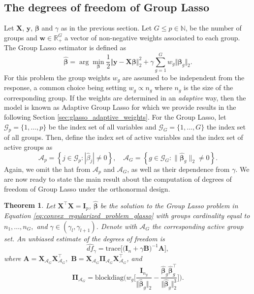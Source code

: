 \documentclass[a4paper, 12pt]{article}
\newcommand{\Aset}{\mathcal{A}}
\newcommand{\betahat}{\widehat{\boldsymbol\beta}}
\newcommand{\trace}{\mathrm{trace}}
\newcommand{\T}{\top}
\def\bbeta{\boldsymbol{\beta}}
\def\bPi{\boldsymbol{\Pi}}
\def\bw{\boldsymbol{w}}
\def\by{\boldsymbol{y}}
\def\bA{\mathbf{A}}
\def\bB{\mathbf{B}}
\def\bI{\mathbf{I}}
\def\bX{\mathbf{X}}
\def\bw{\mathbf{w}}
\def\by{\mathbf{y}}
\newtheorem{theorem}{Theorem}
\begin{document}
\subsection{The degrees of freedom of Group Lasso}
\label{sec:glasso_given_weights}
Let $\bX$, $\by$, $\bbeta$ and $\gamma$ as in the previous section. Let $G \leq p \in \mathbb{N}$, be the number of groups and $\bw \in \mathbb{R}^G_+$ a vector of non-negative weights associated to each group. The Group Lasso \citep{yuan:2006:glasso} estimator is defined as
\begin{equation}
\label{eq:convex_regularized_problem_glasso}
\widehat{\boldsymbol{\beta}}=\arg\min_{\bbeta} \frac{1}{2}\Vert\by-\bX \bbeta \Vert_2^2+\gamma \sum_{g=1}^Gw_g\Vert \bbeta_g\Vert_2.
\end{equation}
For this problem the group weights $w_g$ are assumed to be independent from the response, a common choice being setting $w_g \propto n_g$  where $n_g$ is the size of the corresponding group. If the weights are determined in an \textit{adaptive} way, then the model is known as Adaptive Group Lasso \citep{wangleng2008csda} for which we provide results in the following Section \ref{sec:glasso_adaptive_weights}.
%
For the Group Lasso, let $\mathcal{G}_p=\{1,\dots,p\}$ be the index set of all variables and $\mathcal{G}_G=\{1,\dots,G\}$ the index set of all groups. Then, define the index set of active variables and the index set of active groups as
\begin{equation*}
\label{eq:dof_glasso_Aset_def}
\Aset_p=\left\{j\in\mathcal{G}_p:|\widehat{\beta}_j| \neq 0\right\}, \quad \Aset_G=\left\{g\in\mathcal{G}_G:\lVert\widehat{\bbeta}_g\rVert_2 \neq 0\right\}.
\end{equation*}
Again, we omit the hat from $\Aset_p$ and $\Aset_G$, as well as their dependence from $\gamma$. We are now ready to state the main result about the computation of degrees of freedom of Group Lasso under the orthonormal design.
%
\begin{theorem}
\label{th:df_glasso_ortho}
Let $\bX^{\T}\bX=\bI_p$, $\betahat$ be the solution to the Group Lasso problem in Equation \eqref{eq:convex_regularized_problem_glasso} with groups cardinality equal to $n_1, \ldots, n_G,$ %
and $\gamma \in (\gamma_l, \gamma_{l+1})$. Denote with $\Aset_G$ the corresponding active group set. An unbiased estimate of the degrees of freedom is 
\begin{equation}
\label{eq:dof_glasso_ortho}
\widehat{df}_\gamma = \trace \big[ \big(\bI_n+\gamma \bB \big)^{-1} \bA  \big],
\end{equation} 
where $\bA = \bX_{\Aset_G}\bX_{\Aset_G}^{\T},$ $\bB = \bX_{\Aset_G}\bPi_{\Aset_G}\bX_{\Aset_G}^{\T}$, and 
\begin{equation}
\label{eq:ABPi_g_definition} 
\bPi_{\Aset_G} = \mathrm{blockdiag}\bigg(w_g\bigg[\frac{\bI_{n_g}}{\Vert\betahat_g\Vert_2}-\frac{\betahat_g\betahat_g^{\T}}{\Vert\betahat_g\Vert_2^3}\bigg]\bigg).
\end{equation}
\end{theorem}
\end{document}
